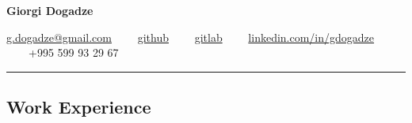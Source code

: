 \documentclass[10pt,letterpaper]{article}
\begin{document}
 
\begin{center}
{\huge \textbf{Giorgi Dogadze}}


\vspace{1em}

\href{mailto:g.dogadze@gmail.com}{g.dogadze@gmail.com} 
\ \ \textbullet \ \ 
\href{https://github.com/giorgi-dogadze}{github} 
\ \ \textbullet \ \ 
\href{https://gitlab.com/gdogadze}{gitlab} 
\ \ \textbullet \ \ 
\href{https://www.linkedin.com/in/gdogadze/}{linkedin.com/in/gdogadze}
\ \ \textbullet \ \ 
+995 599 93 29 67\end{center}


\hrule
\vspace{-1.0em}
\subsection*{Work Experience}
\end{document}
